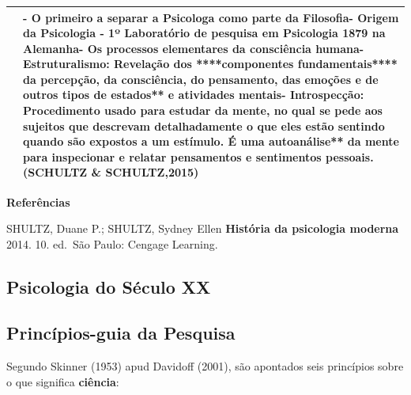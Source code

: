 \documentclass[
]{book}
\begin{document}
\begin{longtable}[]{@{}
  >{\centering\arraybackslash}p{}
  >{\raggedright\arraybackslash}p{}@{}}
\toprule()
\endhead
& - \textbf{O primeiro a separar a Psicologa} como parte da Filosofia- Origem da Psicologia - 1º Laboratório de pesquisa em Psicologia 1879 na Alemanha- Os processos elementares da consciência humana- \textbf{Estruturalismo}: Revelação dos ****componentes fundamentais**** da \textbf{percepção}, da \textbf{consciência}, do \textbf{pensamento}, das \textbf{emoções} e de \textbf{outros tipos de }estados** e \textbf{atividades} mentais\textbf{- }Introspecção\textbf{: Procedimento usado para estudar da mente, no qual se pede aos sujeitos que descrevam detalhadamente o que eles estão sentindo quando são expostos a um estímulo. É uma }autoanálise** da mente para \textbf{inspecionar} e \textbf{relatar} \textbf{pensamentos} e \textbf{sentimentos} pessoais. (SCHULTZ \& SCHULTZ,2015) \\
\bottomrule()
\end{longtable}

\textbf{Referências}

SHULTZ, Duane P.; SHULTZ, Sydney Ellen \textbf{História da psicologia moderna} 2014. 10. ed.~São Paulo: Cengage Learning.

\hypertarget{psicologia-do-suxe9culo-xx-1}{%
\subsection{Psicologia do Século XX}\label{psicologia-do-suxe9culo-xx-1}}

\hypertarget{princuxedpios-guia-da-pesquisa-1}{%
\subsection{Princípios-guia da Pesquisa}\label{princuxedpios-guia-da-pesquisa-1}}

Segundo Skinner (1953) apud Davidoff (2001), são apontados seis princípios sobre o que significa \textbf{ciência}:
\end{document}
